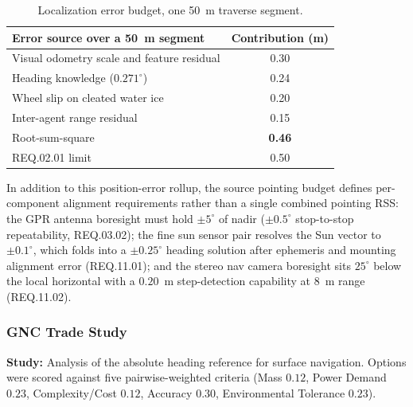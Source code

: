 \documentclass[11pt]{article}
\begin{document}
\begin{table}[H]
\centering
\small
\begin{tabular}{lc}
\toprule
\textbf{Error source over a 50~m segment} & \textbf{Contribution (m)} \\
\midrule
Visual odometry scale and feature residual & 0.30 \\
Heading knowledge ($0.271^\circ$) & 0.24 \\
Wheel slip on cleated water ice & 0.20 \\
Inter-agent range residual & 0.15 \\
\midrule
Root-sum-square & \textbf{0.46} \\
REQ.02.01 limit & 0.50 \\
\bottomrule
\end{tabular}
\caption{Localization error budget, one 50~m traverse segment.}
\label{tab:loc-budget}
\end{table}

In addition to this position-error rollup, the source pointing budget defines
per-component alignment requirements rather than a single combined pointing RSS: the GPR
antenna boresight must hold $\pm 5^\circ$ of nadir ($\pm 0.5^\circ$ stop-to-stop repeatability,
REQ.03.02); the fine sun sensor pair resolves the Sun vector to $\pm 0.1^\circ$, which folds into
a $\pm 0.25^\circ$ heading solution after ephemeris and mounting alignment error (REQ.11.01); and
the stereo nav camera boresight sits $25^\circ$ below the local horizontal with a $0.20$~m
step-detection capability at $8$~m range (REQ.11.02).

\subsubsection{GNC Trade Study}
\textbf{Study:} Analysis of the absolute heading reference for surface navigation.
Options were scored against five pairwise-weighted criteria (Mass $0.12$, Power Demand $0.23$,
Complexity/Cost $0.12$, Accuracy $0.30$, Environmental Tolerance $0.23$).

\begin{table}[H]
\centering
\small
{}
\caption{Absolute heading reference trade study.}
\label{tab:gnc-trade}
\end{table}
\end{document}

